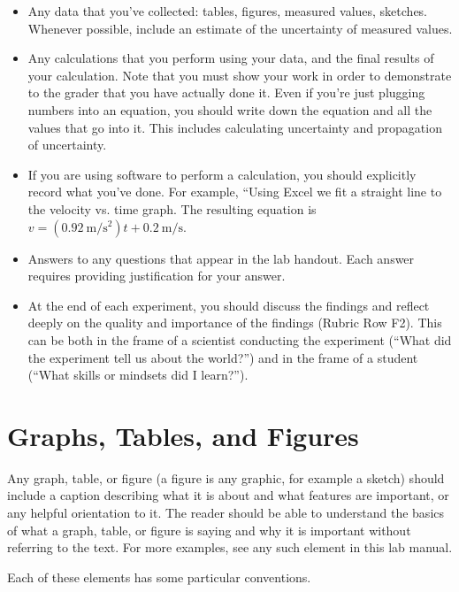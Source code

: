 	\begin{itemize}
		\item Any data that you've collected: tables, figures, measured values, sketches. Whenever possible, include an estimate of the uncertainty of measured values.
		
		\item Any calculations that you perform using your data, and the final results of your calculation. Note that you must show your work in order to demonstrate to the grader that you have actually done it. Even if you're just plugging numbers into an equation, you should write down the equation and all the values that go into it. This includes calculating uncertainty and propagation of uncertainty.
		
		\item If you are using software to perform a calculation, you should explicitly record what you've done. For example, ``Using Excel we fit a straight line to the velocity vs. time graph. The resulting equation is $v = (0.92\:\mathrm{m/s^2}) t + 0.2\:\mathrm{m/s}$.
		
		\item Answers to any questions that appear in the lab handout. Each answer requires providing justification for your answer.
		
		\item At the end of each experiment, you should discuss the findings and reflect deeply on the quality and importance of the findings (Rubric Row F2). This can be both in the frame of a scientist conducting the experiment (``What did the experiment tell us about the world?'') and in the frame of a student (``What skills or mindsets did I learn?'').
	\end{itemize}

\section{Graphs, Tables, and Figures}

Any graph, table, or figure (a figure is any graphic, for example a sketch) should include a caption describing what it is about and what features are important, or any helpful orientation to it. The reader should be able to understand the basics of what a graph, table, or figure is saying and why it is important without referring to the text. For more examples, see any such element in this lab manual.

Each of these elements has some particular conventions.

